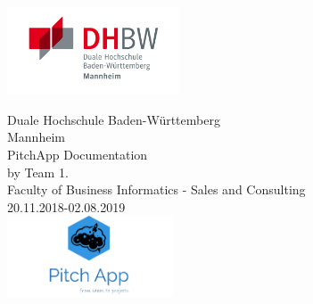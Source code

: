 \thispagestyle{plain}

\begin{titlepage}
	
		
		{\includegraphics[height=2.6cm]{fig/DHBW_MA_Logo.jpg}}	
	
	\enlargethispage{20mm}
	
	\begin{center}
		\vspace*{12mm}   Duale Hochschule Baden-Württemberg\\
		\vspace*{3mm}   Mannheim\\
		\vspace*{12mm}	{\LARGE PitchApp Documentation }\\
		\vspace*{12mm}	{\large by Team 1.}\\
		\vspace*{12mm}	 {\large Faculty of Business Informatics - Sales and Consulting}\\
		\vspace*{12mm}	20.11.2018-02.08.2019\\
		\vspace*{12mm}
		{\includegraphics[height=2.4cm]{fig/logo.png}}
		

\end{center}
\end{titlepage}
